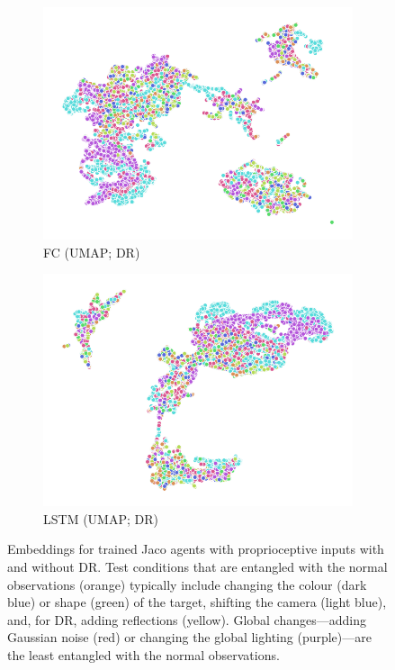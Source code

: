 \begin{figure}
\begin{subfigure}{0.22\textwidth}
    \includegraphics[width=\textwidth]{figures/chapter6/embeddings/jaco_DR_prop_fc1_UMAP.png}
    \caption{FC (UMAP; DR)}
  \end{subfigure}
  \begin{subfigure}{0.22\textwidth}
    \includegraphics[width=\textwidth]{figures/chapter6/embeddings/jaco_DR_prop_h_UMAP.png}
    \caption{LSTM (UMAP; DR)}
  \end{subfigure}
  \caption{Embeddings for trained Jaco agents with proprioceptive inputs with and without DR. Test conditions that are entangled with the normal observations (orange) typically include changing the colour (dark blue) or shape (green) of the target, shifting the camera (light blue), and, for DR, adding reflections (yellow). Global changes---adding Gaussian noise (red) or changing the global lighting (purple)---are the least entangled with the normal observations.}
  \label{fig:act_embeddings}
\end{figure}

